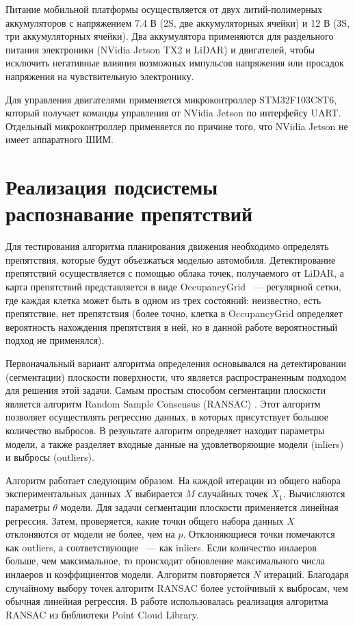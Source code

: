 Питание мобильной платформы осуществляется от двух литий-полимерных аккумуляторов с напряжением 7.4 В (2S, две
аккумуляторных ячейки) и  12 В (3S, три аккумуляторных ячейки). Два аккумулятора применяются для раздельного питания
электроники (NVidia Jetson TX2 и LiDAR) и двигателей, чтобы исключить негативные влияния возможных импульсов напряжения
или просадок напряжения на чувствительную электронику.

Для управления двигателями применяется микроконтроллер STM32F103C8T6, который получает команды управления от
NVidia Jetson по интерфейсу UART. Отдельный микроконтроллер применяется по причине того, что NVidia Jetson не
имеет аппаратного ШИМ.

\section{Реализация подсистемы распознавание препятствий}
Для тестирования алгоритма планирования движения необходимо определять препятствия, которые будут объезжаться
моделью автомобиля. Детектирование препятствий осуществляется с помощью облака точек, получаемого от LiDAR,
а карта препятствий представляется в виде OccupancyGrid ~--- регулярной сетки, где каждая клетка может быть в одном
из трех состояний: неизвестно, есть препятствие, нет препятствия (более точно, клетка в OccupancyGrid определяет
вероятность нахождения препятствия в ней, но в данной работе вероятностный подход не применялся).

Первоначальный вариант алгоритма определения основывался на детектировании (сегментации) плоскости поверхности, что является
распространенным подходом для решения этой задачи. Самым простым способом сегментации плоскости является алгоритм
Random Sample Consensus (RANSAC) \cite{ransac}. Этот алгоритм позволяет осуществлять регрессию данных, в которых
присутствует большое количество выбросов. В результате алгоритм определяет находит параметры модели, а также
разделяет входные данные на удовлетворяющие модели (inliers) и выбросы (outliers).

Алгоритм работает следующим образом. На каждой итерации из общего набора экспериментальных данных $X$ выбирается
$M$ случайных точек $X_1$. Вычисляются параметры $\theta$ модели. Для задачи сегментации плоскости применяется
линейная регрессия. Затем, проверяется, какие точки общего набора данных $X$ отклоняются от модели не более, чем на
$p$. Отклоняющиеся точки помечаются как outliers, а соответствующие ~--- как inliers. Если количество инлаеров больше,
чем максимальное, то происходит обновление максимального числа инлаеров и коэффициентов модели. Алгоритм повторяется
$N$ итераций. Благодаря случайному выбору точек алгоритм RANSAC более устойчивый к выбросам, чем обычная линейная
регрессия. В работе использовалась реализация алгоритма RANSAC из библиотеки Point Cloud Library.

